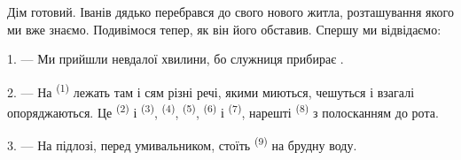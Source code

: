 %
%
%

\VUsaut{6.0mm}
\VUsaut{1.4mm}
\VUsaut{0.4mm}
\VUsaut{2.2mm}

Дім готовий. Іванів дядько перебрався до свого нового житла, розташування
якого ми вже знаємо. Подивімося тепер, як він його обставив. Спершу ми
відвідаємо:

\VUsaut{3.0mm}

1. --- Ми прийшли невдалої хвилини, бо служниця прибирає .

2. --- На  \textsuperscript{(1)} лежать там і сям різні речі,
якими миються, чешуться і взагалі опоряджаються. Це 
\textsuperscript{(2)} і  \textsuperscript{(3)},  \textsuperscript{(4)},  \textsuperscript{(5)},
 \textsuperscript{(6)} і  \textsuperscript{(7)},
нарешті  \textsuperscript{(8)} з полосканням до рота.

3. --- На підлозі, перед умивальником, стоїть 
\textsuperscript{(9)} на брудну воду.

